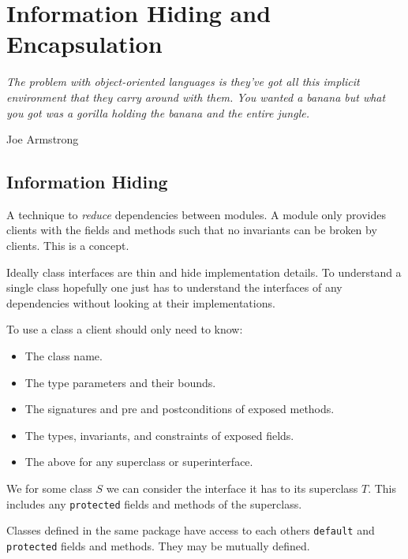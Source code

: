 \documentclass{article}
\begin{document}
\section{Information Hiding and Encapsulation}

\epigraph{\itshape The problem with object-oriented languages is they’ve got all this implicit environment that they carry around with them. You wanted a banana but what you got was a gorilla holding the banana and the entire jungle.}{Joe Armstrong}

\subsection{Information Hiding}

\begin{definition}
A technique to \textit{reduce} dependencies between modules.
A module only provides clients with the fields and methods such that no invariants can be broken by clients.
This is a \textit{\static{}} concept.
\end{definition}

Ideally class interfaces are thin and hide implementation details.
To understand a single class hopefully one just has to understand the interfaces of any dependencies without looking at their implementations.

To use a class a client should only need to know:
\begin{itemize}
\item The class name.
\item The type parameters and their bounds.
\item The signatures and pre and postconditions of exposed methods.
\item The types, invariants, and constraints of exposed fields.
\item The above for any superclass or superinterface.
\end{itemize}

\begin{example}
We for some class $S$ we can consider the interface it has to its superclass $T$.
This includes any \texttt{protected} fields and methods of the superclass.
\end{example}

\begin{example}
Classes defined in the same package have access to each others \texttt{default} and \texttt{protected} fields and methods.
They may be mutually defined.
\end{example}
\end{document}
